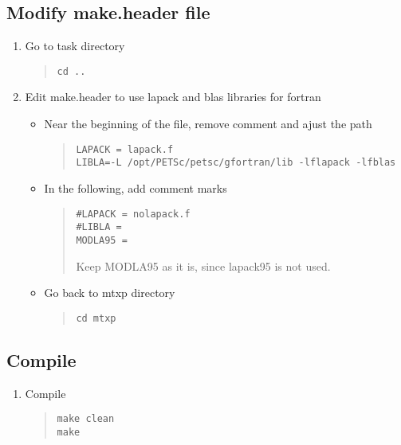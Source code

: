 \documentclass[11pt]{article}
\begin{document}
\subsection{Modify make.header file}
\begin{enumerate}
\item
Go to task directory
\begin{quote}
\begin{verbatim}
cd ..
\end{verbatim}
\end{quote}
\item
Edit make.header to use lapack and blas libraries for fortran
\begin{itemize}
\item
Near the beginning of the file, remove comment and ajust the path
\begin{quote}
\begin{verbatim}
LAPACK = lapack.f
LIBLA=-L /opt/PETSc/petsc/gfortran/lib -lflapack -lfblas
\end{verbatim}
\end{quote}
\item
In the following, add comment marks
\begin{quote}
\begin{verbatim}
#LAPACK = nolapack.f
#LIBLA =
MODLA95 =
\end{verbatim}
Keep MODLA95 as it is, since lapack95 is not used.
\end{quote}
\item
Go back to mtxp directory
\begin{quote}
\begin{verbatim}
cd mtxp
\end{verbatim}
\end{quote}
\end{itemize}
\end{enumerate}

\subsection{Compile}
\begin{enumerate}
\item
Compile
\begin{quote}
\begin{verbatim}
make clean
make
\end{verbatim}
\end{quote}
\end{enumerate}
\end{document}

